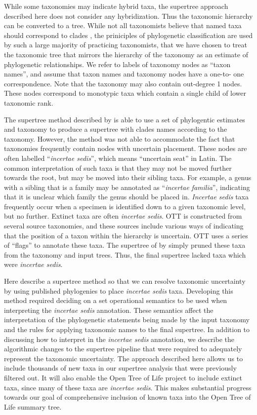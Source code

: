 \documentclass[english]{article}
\begin{document}
While some taxonomies may indicate hybrid taxa, the supertree approach
described here does not consider any hybridization. Thus the taxonomic
hierarchy can be converted to a tree. While not all taxonomists
believe that named taxa should correspond to clades \citep[see, for
example,][]{HorandlS2010}, the priniciples of phylogenetic
classification are used by such a large majority of practicing
taxonomists, that we have chosen to treat the taxonomic tree that
mirrors the hierarchy of the taxonomy as an estimate of phylogenetic
relationships. We refer to labels of taxonomy nodes as ``taxon
names'', and assume that taxon names and taxonomy nodes have a one-to-
one correspondence. Note that the taxonomy may also contain out-degree
1 nodes. These nodes correspond to monotypic taxa which contain a
single child of lower taxonomic rank.

The supertree method described by \citet{redelings2017supertree} is
able to use a set of phylogentic estimates and taxonomy to produce a
supertree with clades names according to the taxonomy. However, the
method was not able to accommodate the fact that taxonomies frequently
contain nodes with uncertain placement. These nodes are often labelled
``\emph{incertae sedis}'', which means ``uncertain seat'' in Latin.
The common interpretation of such taxa is that they may not be moved
further towards the root, but may be moved into their sibling taxa.
For example, a genus with a sibling that is a family may be annotated
as ``\emph{incertae familia}'', indicating that it is unclear which
family the genus should be placed in. \emph{Incertae sedis} taxa
frequently occur when a specimen is identified down to a given
taxonomic level, but no further. Extinct taxa are often \emph{incertae
sedis}. OTT is constructed from several source taxonomies, and these
sources include various ways of indicating that the position of a
taxon within the hierarchy is uncertain. OTT uses a series of
``flags'' to annotate these taxa. The supertree of by
\citet{redelings2017supertree} simply pruned these taxa from the
taxonomy and input trees. Thus, the final supertree lacked taxa which
were \emph{incertae sedis}.

Here describe a supertree method so that we can resolve taxonomic
uncertainty by using published phylogenies to place \emph{incertae
sedis} taxa. Developing this method required deciding on a set
operational semantics to be used when interpreting the \emph{incertae
sedis} annotation. These semantics affect the interpretation of the
phylogenetic statements being made by the input taxonomy and the rules
for applying taxonomic names to the final supertree. In addition to
discussing how to interpret in the \emph{incertae sedis} annotation,
we describe the algorithmic changes to the supertree pipeline that
were required to adequately represent the taxonomic uncertainty. The
approach described here allows us to include thousands of new taxa in
our supertree analysis that were previously filtered out. It will also
enable the Open Tree of Life project to include extinct taxa, since
many of these taxa are \emph{incertae sedis}. This makes substantial
progress towards our goal of comprehensive inclusion of known taxa
into the Open Tree of Life summary tree.
\end{document}
